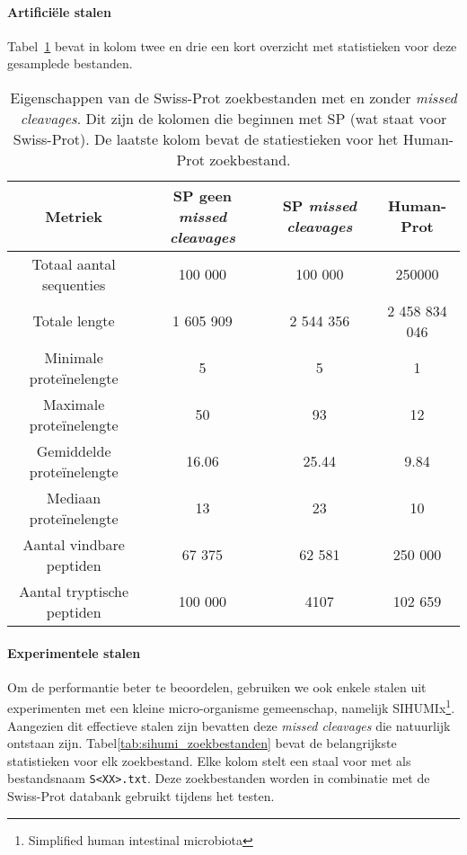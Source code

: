 \paragraph{Artificiële stalen}
Tabel~\ref{tab:artifiele_bestanden_statistieken} bevat in kolom twee en drie een kort overzicht met statistieken voor deze gesamplede bestanden.

\begin{table}[!h]
    \centering
    \begin{tabular}{c c c c}
        Metriek                    & SP geen \textit{missed cleavages} & SP \textit{missed cleavages} & Human-Prot    \\
        \hline\hline
        Totaal aantal sequenties   & 100 000                           & 100 000                      & 250000        \\
        Totale lengte              & 1 605 909                         & 2 544 356                    & 2 458 834 046 \\
        Minimale proteïnelengte    & 5                                 & 5                            & 1             \\
        Maximale proteïnelengte    & 50                                & 93                           & 12            \\
        Gemiddelde proteïnelengte  & 16.06                             & 25.44                        & 9.84          \\
        Mediaan proteïnelengte     & 13                                & 23                           & 10            \\
        Aantal vindbare peptiden   & 67 375                            & 62 581                       & 250 000       \\
        Aantal tryptische peptiden & 100 000                           & 4107                         & 102 659       \\
        \hline
    \end{tabular}
    \caption{Eigenschappen van de Swiss-Prot zoekbestanden met en zonder \textit{missed cleavages}. Dit zijn de kolomen die beginnen met SP (wat staat voor Swiss-Prot). De laatste kolom bevat de statiestieken voor het Human-Prot zoekbestand.}
    \label{tab:artifiele_bestanden_statistieken}
\end{table}

\paragraph{Experimentele stalen}
Om de performantie beter te beoordelen, gebruiken we ook enkele stalen uit experimenten met een kleine micro-organisme gemeenschap, namelijk SIHUMIx\footnote{Simplified human intestinal microbiota}\cite{SIHUMI_first_introduction, SIHUMI_frequently_used}.
Aangezien dit effectieve stalen zijn bevatten deze \textit{missed cleavages} die natuurlijk ontstaan zijn.
Tabel\ref{tab:sihumi_zoekbestanden} bevat de belangrijkste statistieken voor elk zoekbestand.
Elke kolom stelt een staal voor met als bestandsnaam \texttt{S<XX>.txt}.
Deze zoekbestanden worden in combinatie met de Swiss-Prot databank gebruikt tijdens het testen.

